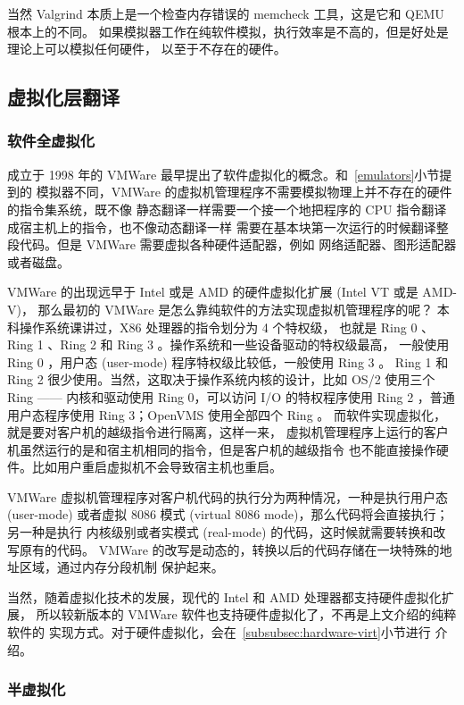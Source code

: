 当然 Valgrind 本质上是一个检查内存错误的 memcheck 工具，这是它和 QEMU 根本上的不同。
如果模拟器工作在纯软件模拟，执行效率是不高的，但是好处是理论上可以模拟任何硬件，
以至于不存在的硬件。

\subsection{虚拟化层翻译}

\subsubsection{软件全虚拟化}
\label{subsubsec:software-virt}

成立于 1998 年的 VMWare 最早提出了软件虚拟化的概念。和~\ref{emulators}小节提到的
模拟器不同，VMWare 的虚拟机管理程序不需要模拟物理上并不存在的硬件的指令集系统，既不像
静态翻译一样需要一个接一个地把程序的 CPU 指令翻译成宿主机上的指令，也不像动态翻译一样
需要在基本块第一次运行的时候翻译整段代码。但是 VMWare 需要虚拟各种硬件适配器，例如
网络适配器、图形适配器或者磁盘。

VMWare 的出现远早于 Intel 或是 AMD 的硬件虚拟化扩展 (Intel VT 或是 AMD-V)，
那么最初的 VMWare 是怎么靠纯软件的方法实现虚拟机管理程序的呢？
本科操作系统课讲过，X86 处理器的指令划分为 4 个特权级，
也就是 Ring 0 、Ring 1 、Ring 2 和 Ring 3 。操作系统和一些设备驱动的特权级最高，
一般使用 Ring 0 ，用户态 (user-mode) 程序特权级比较低，一般使用 Ring 3 。
Ring 1 和 Ring 2 很少使用。当然，这取决于操作系统内核的设计，比如
OS/2 使用三个 Ring —— 内核和驱动使用 Ring 0，可以访问 I/O 的特权程序使用
Ring 2 ，普通用户态程序使用 Ring 3；OpenVMS 使用全部四个 Ring 。
而软件实现虚拟化，就是要对客户机的越级指令进行隔离，这样一来，
虚拟机管理程序上运行的客户机虽然运行的是和宿主机相同的指令，但是客户机的越级指令
也不能直接操作硬件。比如用户重启虚拟机不会导致宿主机也重启。

VMWare 虚拟机管理程序对客户机代码的执行分为两种情况，一种是执行用户态 (user-mode)
或者虚拟 8086 模式 (virtual 8086 mode)，那么代码将会直接执行；另一种是执行
内核级别或者实模式 (real-mode) 的代码，这时候就需要转换和改写原有的代码。
VMWare 的改写是动态的，转换以后的代码存储在一块特殊的地址区域，通过内存分段机制
保护起来。

当然，随着虚拟化技术的发展，现代的 Intel 和 AMD 处理器都支持硬件虚拟化扩展，
所以较新版本的 VMWare 软件也支持硬件虚拟化了，不再是上文介绍的纯粹软件的
实现方式。对于硬件虚拟化，会在~\ref{subsubsec:hardware-virt}小节进行
介绍。

\subsubsection{半虚拟化}
\label{subsubsec:paravirtualization}

